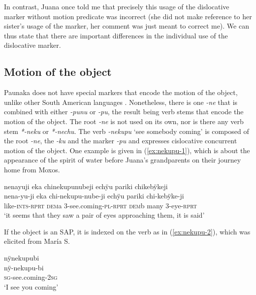 In contrast, Juana once told me that precisely this usage of the dislocative marker without motion predicate was incorrect (she did not make reference to her sister’s usage of the marker, her comment was just meant to correct me). We can thus state that there are important differences in the individual use of the dislocative marker.

\subsection{Motion of the object}\label{sec:OBJ-AM}

Paunaka does not have special markers that encode the motion of the object, unlike other South American languages \citep[cf.][]{Guillaume2016}. Nonetheless, there is one  \textit{-ne} that is combined with either \textit{-punu} or \textit{-pu}, the result being verb stems that encode the motion of the object. The root \textit{-ne} is not used on its own, nor is there any verb stem \textit{*-neku} or \textit{*-nechu}. The verb \textit{-nekupu} ‘see somebody coming’ is composed of the root \textit{-ne}, the  \textit{-ku} and the  marker \textit{-pu} and expresses cislocative concurrent motion of the object. One example is given in (\ref{ex:nekupu-1}), which is about the appearance of the spirit of water before Juana’s grandparents on their journey home from Moxos.

\ea\label{ex:nekupu-1}
\begingl 
\glpreamble nenayuji eka chinekupunubeji echÿu pariki chikebÿkeji\\
\gla nena-yu-ji eka chi-nekupu-nube-ji echÿu pariki chi-kebÿke-ji\\ 
\glb like-\textsc{ints}-\textsc{rprt} \textsc{dem}a 3-see.coming-\textsc{pl}-\textsc{rprt} \textsc{dem}b many 3-eye-\textsc{rprt}\\ 
\glft ‘it seems that they saw a pair of eyes approaching them, it is said’\\ 
\endgl
\trailingcitation{[jxx-p151016l-2]}
\xe

If the object is an SAP, it is indexed on the verb as in (\ref{ex:nekupu-2}), which was elicited from María S.

\ea\label{ex:nekupu-2}
\begingl 
\glpreamble nÿnekupubi\\
\gla nÿ-nekupu-bi\\ 
\textsc{sg}-see.coming-2\textsc{sg}\\ 
\glft ‘I see you coming’\\ 
\endgl
\trailingcitation{[mrx-e150219s.088]}
\xe

